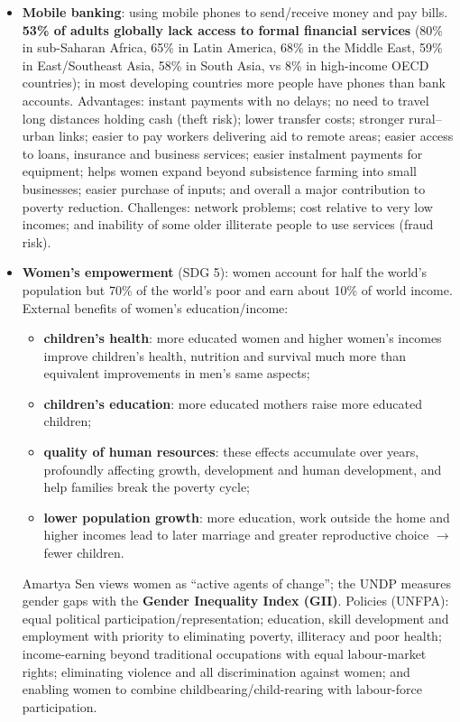 \begin{itemize}
\begin{itemize}
    \item A well-known example is the \textbf{Grameen Bank} in Bangladesh, which provides credit to poor people without collateral.
  \end{itemize}
  \item \textbf{Mobile banking}: using mobile phones to send/receive money and pay bills. \textbf{53\% of adults globally lack access to formal financial services} (80\% in sub-Saharan Africa, 65\% in Latin America, 68\% in the Middle East, 59\% in East/Southeast Asia, 58\% in South Asia, vs 8\% in high-income OECD countries); in most developing countries more people have phones than bank accounts. Advantages: instant payments with no delays; no need to travel long distances holding cash (theft risk); lower transfer costs; stronger rural--urban links; easier to pay workers delivering aid to remote areas; easier access to loans, insurance and business services; easier instalment payments for equipment; helps women expand beyond subsistence farming into small businesses; easier purchase of inputs; and overall a major contribution to poverty reduction. Challenges: network problems; cost relative to very low incomes; and inability of some older illiterate people to use services (fraud risk).
  \item \textbf{Women's empowerment} (SDG 5): women account for half the world's population but 70\% of the world's poor and earn about 10\% of world income. External benefits of women's education/income:
  \begin{itemize}
    \item \textbf{children's health}: more educated women and higher women's incomes improve children's health, nutrition and survival much more than equivalent improvements in men's same aspects;
    \item \textbf{children's education}: more educated mothers raise more educated children;
    \item \textbf{quality of human resources}: these effects accumulate over years, profoundly affecting growth, development and human development, and help families break the poverty cycle;
    \item \textbf{lower population growth}: more education, work outside the home and higher incomes lead to later marriage and greater reproductive choice $\to$ fewer children.
  \end{itemize}
  Amartya Sen views women as ``active agents of change''; the UNDP measures gender gaps with the \textbf{Gender Inequality Index (GII)}. Policies (UNFPA): equal political participation/representation; education, skill development and employment with priority to eliminating poverty, illiteracy and poor health; income-earning beyond traditional occupations with equal labour-market rights; eliminating violence and all discrimination against women; and enabling women to combine childbearing/child-rearing with labour-force participation.

\end{itemize}
